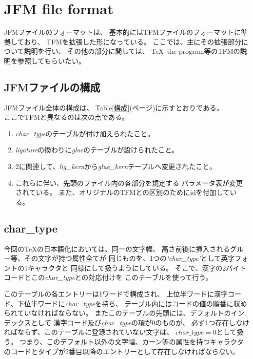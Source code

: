 ﻿\documentclass[twoside]{jarticle}
\begin{document}
\section{JFM file format}
JFMファイルのフォーマットは、
基本的にはTFMファイルのフォーマットに準拠しており、
TFMを拡張した形になっている。
ここでは、主にその拡張部分について説明を行い、
その他の部分に関しては、
\TeX\ the program等のTFMの説明を参照してもらいたい。
\subsection{JFMファイルの構成}
JFMファイル全体の構成は、
Table\ref{構成}(\pageref{構成}ページ)に示すとおりである。 \\
ここでTFMと異なるのは次の点である。
\begin{enumerate}
\item {\it char\_type}のテーブルが付け加えられたこと。
\item {\it ligature}の換わりに{\it glue}のテーブルが設けられたこと。
\item 2に関連して、{\it lig\_kern}から{\it glue\_kern}テーブルへ変更されたこと。
\item これらに伴い、先頭のファイル内の各部分を規定する
	パラメータ表が変更されている。
	また、オリジナルのTFMとの区別のためにidを付加している。
\end{enumerate}

\subsection{char\_type}
今回の\TeX の日本語化においては、同一の文字幅、
高さ前後に挿入されるグルー等、その文字が持つ属性全てが
同じものを、1つの{\it `char\_type'}として英字フォントの1キャラクタと
同様にして扱うようにしている。
そこで、漢字の2バイトコードとこの{\it char\_type}との対応付けを
このテーブルを使って行う。

このテーブルの各エントリーは1ワードで構成され、
上位半ワードに漢字コード、下位半ワードに{\it char\_type}を持ち、
テーブル内にはコードの値の順番に収められていなければならない。
またこのテーブルの先頭には、デフォルトのインデックスとして
漢字コード及び{\it char\_type}の項が0のものが、
必ず1つ存在しなければならず、このテーブルに登録されていない文字は、
$char\_type = 0$として扱う。
つまり、このデフォルト以外の文字幅、カーン等の属性を持つキャラクタ
のコードとタイプが2番目以降のエントリーとして存在しなければならない。
\end{document}
